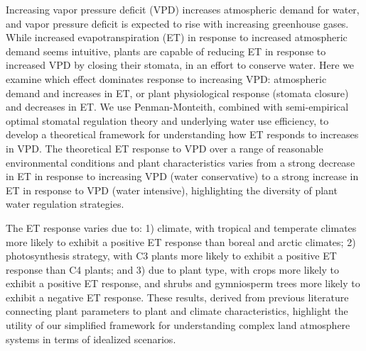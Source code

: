 Increasing vapor pressure deficit (VPD) increases atmospheric demand
for water, and vapor pressure deficit is expected to rise with
increasing greenhouse gases. While increased evapotranspiration (ET)
in response to increased atmospheric demand seems intuitive, plants
are capable of reducing ET in response to increased VPD by closing
their stomata, in an effort to conserve water. Here we examine which
effect dominates response to increasing VPD: atmospheric demand and
increases in ET, or plant physiological response (stomata closure) and
decreases in ET. We use Penman-Monteith, combined with semi-empirical
optimal stomatal regulation theory and underlying water use
efficiency, to develop a theoretical framework for understanding how
ET responds to increases in VPD. The theoretical ET response to VPD
over a range of reasonable environmental conditions and plant
characteristics varies from a strong decrease in ET in response to
increasing VPD (water conservative) to a strong increase in ET in
response to VPD (water intensive), highlighting the diversity of plant
water regulation strategies.

The ET response varies due to: 1) climate, with tropical and
temperate climates more likely to exhibit a positive ET response than
boreal and arctic climates; 2) photosynthesis strategy, with C3 plants
more likely to exhibit a positive ET response than C4 plants; and 3)
due to plant type, with crops more likely to exhibit a positive ET
response, and shrubs and gymniosperm trees more likely to exhibit a
negative ET response. These results, derived from previous literature
connecting plant parameters to plant and climate characteristics,
highlight the utility of our simplified framework for understanding
complex land atmosphere systems in terms of idealized scenarios.
